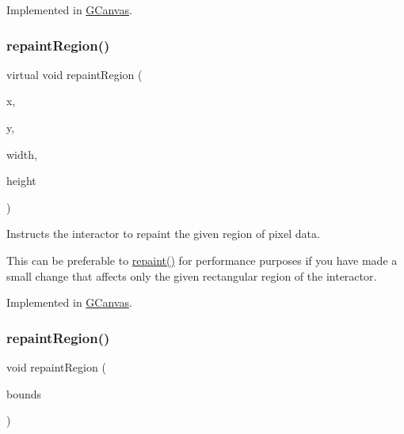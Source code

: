 Implemented in \mbox{\hyperlink{classGCanvas_ab93427f61c64e3db7f2637519aed1c00}{G\+Canvas}}.

\mbox{\label{classGDrawingSurface_a1a3898317080fecf8af21bbeaeeb37c3}} 
\subsubsection{\texorpdfstring{repaint\+Region()}{repaintRegion()}\hspace{0.1cm}{\footnotesize\ttfamily [1/2]}}
{\footnotesize\ttfamily virtual void repaint\+Region (\begin{DoxyParamCaption}\item[{int}]{x,  }\item[{int}]{y,  }\item[{int}]{width,  }\item[{int}]{height }\end{DoxyParamCaption})\hspace{0.3cm}{\ttfamily [pure virtual]}}



Instructs the interactor to repaint the given region of pixel data. 

This can be preferable to \mbox{\hyperlink{classGDrawingSurface_a4a8ae47b42f1e6a41b65d3546df46218}{repaint()}} for performance purposes if you have made a small change that affects only the given rectangular region of the interactor. 

Implemented in \mbox{\hyperlink{classGCanvas_a52152a764c4c4b092f826eee5d6554aa}{G\+Canvas}}.

\mbox{\label{classGDrawingSurface_a769c46fb3e1004aec76e8b0adfa42aa6}} 
\subsubsection{\texorpdfstring{repaint\+Region()}{repaintRegion()}\hspace{0.1cm}{\footnotesize\ttfamily [2/2]}}
{\footnotesize\ttfamily void repaint\+Region (\begin{DoxyParamCaption}\item[{const \mbox{\hyperlink{classGRectangle}{G\+Rectangle}} \&}]{bounds }\end{DoxyParamCaption})\hspace{0.3cm}{\ttfamily [virtual]}}



